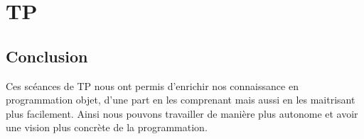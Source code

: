 \documentclass[12pt,a4paper]{book} %
\begin{document}


\pagestyle{empty} %

\tableofcontents %

\cleardoublepage %

\pagestyle{fancy} %



\pagestyle{empty} %

\listoffigures %

\cleardoublepage %

\pagestyle{fancy} %


\part{TP}







\cleardoublepage %

\pagestyle{empty}


\chapter*{Conclusion}

Ces scéances de TP nous ont permis d'enrichir nos connaissance en programmation objet, d'une part en les comprenant mais aussi en les maitrisant plus facilement. Ainsi nous pouvons travailler de manière plus autonome et avoir une vision plus concrète de la programmation.

\pagestyle{fancy}

\end{document}
